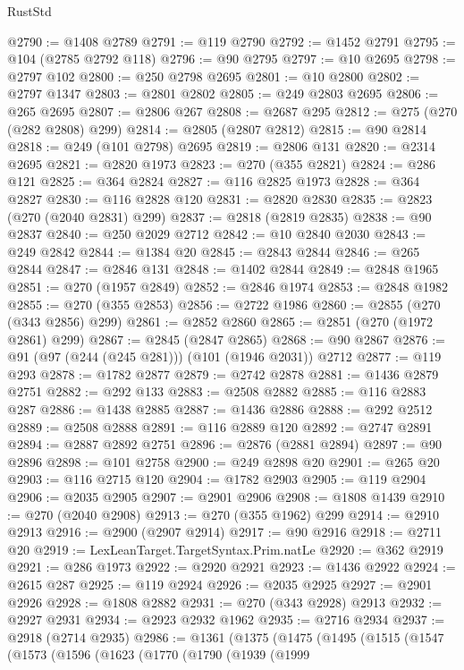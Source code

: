 \begin{lexlean}{RustStd}
\begin{coremodule}
@2790 := @1408 @2789
@2791 := @119 @2790
@2792 := @1452 @2791
@2795 := @104 (@2785 @2792 @118)
@2796 := @90 @2795
@2797 := @10 @2695
@2798 := @2797 @102
@2800 := @250 @2798 @2695
@2801 := @10 @2800
@2802 := @2797 @1347
@2803 := @2801 @2802
@2805 := @249 @2803 @2695
@2806 := @265 @2695
@2807 := @2806 @267
@2808 := @2687 @295
@2812 := @275 (@270 (@282 @2808) @299)
@2814 := @2805 (@2807 @2812)
@2815 := @90 @2814
@2818 := @249 (@101 @2798) @2695
@2819 := @2806 @131
@2820 := @2314 @2695
@2821 := @2820 @1973
@2823 := @270 (@355 @2821)
@2824 := @286 @121
@2825 := @364 @2824
@2827 := @116 @2825 @1973
@2828 := @364 @2827
@2830 := @116 @2828 @120
@2831 := @2820 @2830
@2835 := @2823 (@270 (@2040 @2831) @299)
@2837 := @2818 (@2819 @2835)
@2838 := @90 @2837
@2840 := @250 @2029 @2712
@2842 := @10 @2840 @2030
@2843 := @249 @2842
@2844 := @1384 @20
@2845 := @2843 @2844
@2846 := @265 @2844
@2847 := @2846 @131
@2848 := @1402 @2844
@2849 := @2848 @1965
@2851 := @270 (@1957 @2849)
@2852 := @2846 @1974
@2853 := @2848 @1982
@2855 := @270 (@355 @2853)
@2856 := @2722 @1986
@2860 := @2855 (@270 (@343 @2856) @299)
@2861 := @2852 @2860
@2865 := @2851 (@270 (@1972 @2861) @299)
@2867 := @2845 (@2847 @2865)
@2868 := @90 @2867
@2876 := @91 (@97 (@244 (@245 @281))) (@101 (@1946 @2031)) @2712
@2877 := @119 @293
@2878 := @1782 @2877
@2879 := @2742 @2878
@2881 := @1436 @2879 @2751
@2882 := @292 @133
@2883 := @2508 @2882
@2885 := @116 @2883 @287
@2886 := @1438 @2885
@2887 := @1436 @2886
@2888 := @292 @2512
@2889 := @2508 @2888
@2891 := @116 @2889 @120
@2892 := @2747 @2891
@2894 := @2887 @2892 @2751
@2896 := @2876 (@2881 @2894)
@2897 := @90 @2896
@2898 := @101 @2758
@2900 := @249 @2898 @20
@2901 := @265 @20
@2903 := @116 @2715 @120
@2904 := @1782 @2903
@2905 := @119 @2904
@2906 := @2035 @2905
@2907 := @2901 @2906
@2908 := @1808 @1439
@2910 := @270 (@2040 @2908)
@2913 := @270 (@355 @1962) @299
@2914 := @2910 @2913
@2916 := @2900 (@2907 @2914)
@2917 := @90 @2916
@2918 := @2711 @20
@2919 := LexLeanTarget.TargetSyntax.Prim.natLe
@2920 := @362 @2919
@2921 := @286 @1973
@2922 := @2920 @2921
@2923 := @1436 @2922
@2924 := @2615 @287
@2925 := @119 @2924
@2926 := @2035 @2925
@2927 := @2901 @2926
@2928 := @1808 @2882
@2931 := @270 (@343 @2928) @2913
@2932 := @2927 @2931
@2934 := @2923 @2932 @1962
@2935 := @2716 @2934
@2937 := @2918 (@2714 @2935)
@2986 := @1361
    (@1375
      (@1475
        (@1495
          (@1515
            (@1547
              (@1573
                (@1596
                  (@1623
                    (@1770
                      (@1790
                        (@1939
                          (@1999

\end{coremodule}
\end{lexlean}
